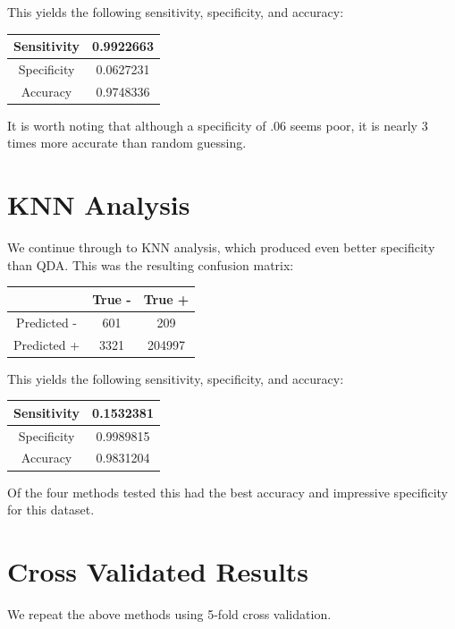 \documentclass[10pt,twocolumn,letterpaper]{article}
\begin{document}
This yields the following sensitivity, specificity, and accuracy:
\begin{center}
	\begin{tabular}{ |c|c| } 
		\hline
		Sensitivity & 0.9922663 \\ 
		\hline
		Specificity & 0.0627231 \\
		\hline
		Accuracy & 0.9748336\\ 
		\hline
	\end{tabular}
\end{center}

It is worth noting that although a specificity of .06 seems poor, it is nearly 3 times more accurate than random guessing.


\section{KNN Analysis}

We continue through to KNN analysis, which produced even better specificity than QDA. This was the resulting confusion matrix:

\begin{center}
	\begin{tabular}{ |c|c|c| } 
		\hline
		& True - & True +\\ 
		\hline
		Predicted - & 601 & 209 \\ 
		\hline
		Predicted + & 3321 & 204997\\
		\hline
	\end{tabular}
\end{center}
This yields the following sensitivity, specificity, and accuracy:
\begin{center}
	\begin{tabular}{ |c|c| } 
		\hline
		Sensitivity & 0.1532381 \\ 
		\hline
		Specificity & 0.9989815 \\
		\hline
		Accuracy & 0.9831204 \\ 
		\hline
	\end{tabular}
\end{center}

Of the four methods tested this had the best accuracy and impressive specificity for this dataset. 


\section{Cross Validated Results}

We repeat the above methods using 5-fold cross validation.
\end{document}

